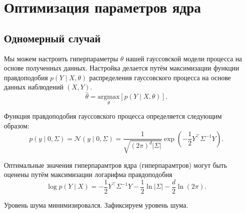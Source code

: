 \documentclass[11pt,a4paper]{article}
\begin{document}

    \hypertarget{ux43eux43fux442ux438ux43cux438ux437ux430ux446ux438ux44f-ux43fux430ux440ux430ux43cux435ux442ux440ux43eux432-ux44fux434ux440ux430}{%
\section{Оптимизация параметров
ядра}\label{ux43eux43fux442ux438ux43cux438ux437ux430ux446ux438ux44f-ux43fux430ux440ux430ux43cux435ux442ux440ux43eux432-ux44fux434ux440ux430}}

    \hypertarget{ux43eux434ux43dux43eux43cux435ux440ux43dux44bux439-ux441ux43bux443ux447ux430ux439}{%
\subsection{Одномерный
случай}\label{ux43eux434ux43dux43eux43cux435ux440ux43dux44bux439-ux441ux43bux443ux447ux430ux439}}

    Мы можем настроить гиперпараметры \(\theta\) нашей гауссовской модели
процесса на основе полученных данных. Настройка делается путём
максимизации функции правдоподобия \(p(Y \mid X, \theta)\) распределения
гауссовского процесса на основе данных наблюдений \((X, Y)\). \[
  \hat{\theta}  = \underset{\theta}{\text{argmax}} \left[ p(Y \mid X, \theta) \right].
\]

    Функция правдоподобия гауссовского процесса определяется следующим
образом: \[
  p(y \mid 0, \Sigma) = \mathcal{N}(y \mid 0, \Sigma) =
  \frac{1}{\sqrt{(2\pi)^d \lvert\Sigma\rvert}} \exp{ \left( -\frac{1}{2}Y^\top \Sigma^{-1} Y \right)}.
\]

    Оптимальные значения гиперпарамтров ядра (гиперпарамтров) могут быть
оценены путём максимизации логарифма правдоподобия \[
  \log p(Y \mid X) = - \frac{1}{2} Y^\top \Sigma^{-1} Y -\frac{1}{2} \ln \lvert \Sigma \rvert - \frac{d}{2} \ln(2\pi). \tag{1}
\]


    \begin{center}
    \end{center}

    Уровень шума минимизировался. Зафиксируем уровень шума.
\end{document}
